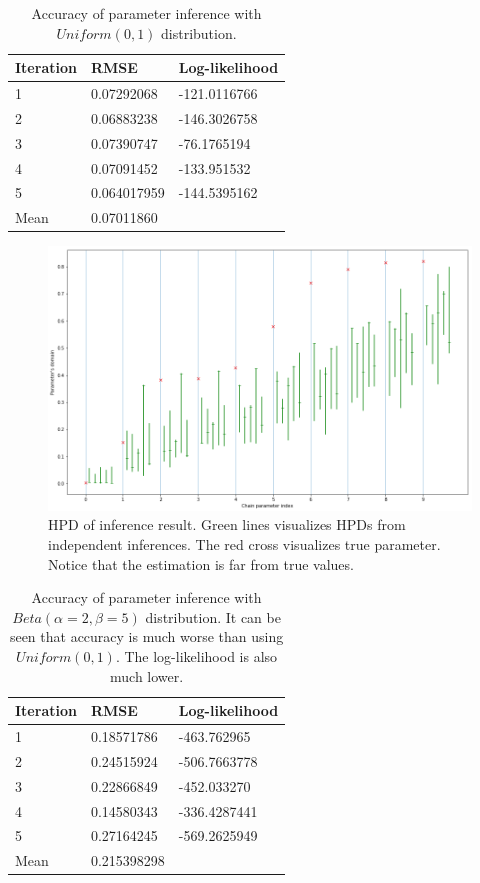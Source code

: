 \documentclass[12pt]{article}
\theoremstyle{definition}
\begin{document}
\begin{table}[H]
  \centering
  \begin{tabular}{|l|l|l|}
    \hline
    Iteration & RMSE        & Log-likelihood \\ \hline
    1         & 0.07292068  & -121.0116766   \\ \hline
    2         & 0.06883238  & -146.3026758   \\ \hline
    3         & 0.07390747  & -76.1765194    \\ \hline
    4         & 0.07091452  & -133.951532    \\ \hline
    5         & 0.064017959 & -144.5395162   \\ \hline
    Mean      & 0.07011860  &                \\ \hline
  \end{tabular}
  \caption{Accuracy of parameter inference with $Uniform(0,1)$ distribution.}
\end{table}

\begin{figure}[H]
  \centering
  \includegraphics[width=\textwidth,keepaspectratio]{figures/prior_beta.png}
  \caption{HPD of inference result. Green lines visualizes HPDs from independent
    inferences. The red cross visualizes true parameter. Notice that the
    estimation is far from true values.}
\end{figure}

\begin{table}[H]
  \centering
  \begin{tabular}{|l|l|l|}
    \hline
    Iteration & RMSE        & Log-likelihood \\ \hline
    1         & 0.18571786  & -463.762965    \\ \hline
    2         & 0.24515924  & -506.7663778   \\ \hline
    3         & 0.22866849  & -452.033270    \\ \hline
    4         & 0.14580343  & -336.4287441   \\ \hline
    5         & 0.27164245  & -569.2625949   \\ \hline
    Mean      & 0.215398298 &               
  \end{tabular}
  \caption{Accuracy of parameter inference with $Beta(\alpha=2,\beta=5)$
    distribution. It can be seen that accuracy is much worse than using
    $Uniform(0,1)$. The log-likelihood is also much lower.}
\end{table}
\end{document}
